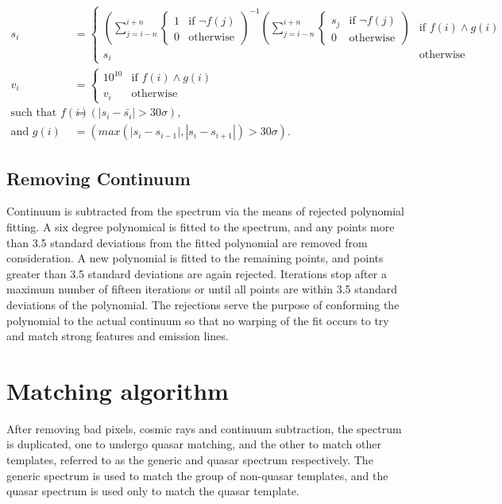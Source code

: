 \documentclass[titlesmallcaps, examinerscopy, copyrightpage]{uqthesis}
\newcommand{\brac}[1]{\left( #1 \right)}
\newcommand*\mean[1]{\bar{#1}}
\newcommand\abs[1]{\left|#1\right|}
\begin{document}
\begin{align}
s_i &= 
\begin{cases}
	\brac{\sum\limits_{j=i-n}^{i+n} \begin{cases}1 & \text{if } \lnot f(j) \\ 0 & \text{otherwise} \end{cases}}^{-1}\brac{\sum\limits_{j=i-n}^{i+n} \begin{cases}s_j & \text{if } \lnot f(j) \\ 0 & \text{otherwise} \end{cases}} & \text{if } f(i)\land g(i) \\
	s_i & \text{otherwise}
\end{cases}\\
v_i &= 
\begin{cases}
	10^{10} & \text{if } f(i)\land g(i) \\
	v_i & \text{otherwise}
\end{cases}\\
\text{such that } f(i) &= \brac{\abs{s_i - \mean{s_i}} > 30 \sigma}, \\
\text{and } g(i) &= \brac{max\brac{\abs{s_i - s_{i-1}}, \abs{s_i - s_{i+1}}} > 30 \sigma}.
\end{align} 


\subsection{Removing Continuum} \label{sec:continuum}

Continuum is subtracted from the spectrum via the means of rejected polynomial fitting. A six degree polynomical is fitted to the spectrum, and any points more than 3.5 standard deviations from the fitted polynomial are removed from consideration. A new polynomial is fitted to the remaining points, and points greater than 3.5 standard deviations are again rejected. Iterations stop after a maximum number of fifteen iterations or until all points are within 3.5 standard deviations of the polynomial. The rejections serve the purpose of conforming the polynomial to the actual continuum so that no warping of the fit occurs to try and match strong features and emission lines.



\section{Matching algorithm}

After removing bad pixels, cosmic rays and continuum subtraction, the spectrum is duplicated, one to undergo quasar matching, and the other to match other templates, referred to as the generic and quasar spectrum respectively. The generic spectrum is used to match the group of non-quasar templates, and the quasar spectrum is used only to match the quasar template.
\end{document}
